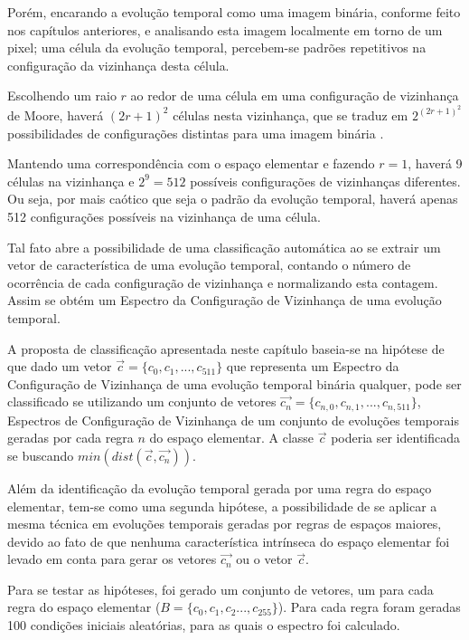 \documentclass[12pt,a4paper]{report}
\begin{document}
	Porém, encarando a evolução temporal como uma imagem binária, conforme feito nos capítulos anteriores, e analisando esta imagem localmente em torno de um pixel; uma célula da evolução temporal, percebem-se padrões repetitivos na configuração da vizinhança desta célula.
	
	Escolhendo um raio $r$ ao redor de uma célula em uma configuração de vizinhança de Moore, haverá $(2r + 1)^2$ células nesta vizinhança, que se traduz em $2^{(2r + 1)^2}$ possibilidades de configurações distintas para uma imagem binária \cite{http://mathworld.wolfram.com-01}.
	
	Mantendo uma correspondência com o espaço elementar e fazendo $r = 1$, haverá 9 células na vizinhança e $2^9 = 512$ possíveis configurações de vizinhanças diferentes. Ou seja, por mais caótico que seja o padrão da evolução temporal, haverá apenas 512 configurações possíveis na vizinhança de uma célula.
	
	Tal fato abre a possibilidade de uma classificação automática ao se extrair um vetor de característica de uma evolução temporal, contando o número de ocorrência de cada configuração de vizinhança e normalizando esta contagem. Assim se obtém um Espectro da Configuração de Vizinhança de uma evolução temporal.
	
	A proposta de classificação apresentada neste capítulo baseia-se na hipótese de que dado um vetor $\vec{c}=\{c_0,c_1,...,c_{511}\}$ que representa um Espectro da Configuração de Vizinhança de uma evolução temporal binária qualquer, pode ser classificado se utilizando um conjunto de vetores $\vec{c_n}=\{c_{n,0},c_{n,1},...,c_{n,511}\}$, Espectros de Configuração de Vizinhança de um conjunto de evoluções temporais geradas por cada regra $n$ do espaço elementar. A classe $\vec{c}$ poderia ser identificada se buscando $min(dist(\vec{c},\vec{c_n}))$.
	
	Além da identificação da evolução temporal gerada por uma regra do espaço elementar, tem-se como uma segunda hipótese, a possibilidade de se aplicar a mesma técnica em evoluções temporais geradas por regras de espaços maiores, devido ao fato de que nenhuma característica intrínseca do espaço elementar foi levado em conta para gerar os vetores $\vec{c_n}$ ou o vetor $\vec{c}$.
	
	Para se testar as hipóteses, foi gerado um conjunto de vetores, um para cada regra do espaço elementar ($B=\{c_0,c_1,c_2...,c_{255}\}$). Para cada regra foram geradas 100 condições iniciais aleatórias, para as quais o espectro foi calculado.
	
\end{document}
